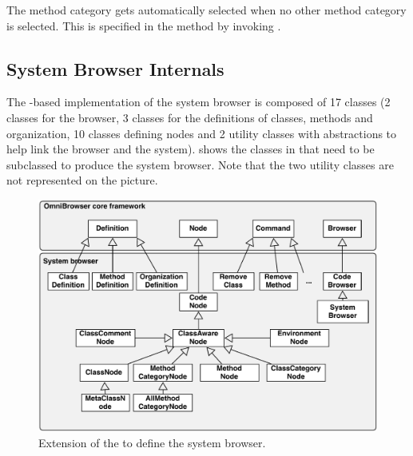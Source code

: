\documentclass[a4paper,10pt,twoside]{book}
\begin{document}
The  method category gets automatically selected when no other method category is selected. This is specified in the  method by invoking .

\subsection{System Browser Internals}
The \ob-based implementation of the \pharo system browser is composed of 17 classes (2 classes for the browser, 3 classes for the definitions of classes, methods and organization, 10 classes defining nodes and 2 utility classes with abstractions to help link the browser and the system).  shows the classes in \obf that need to be subclassed to produce the system browser. Note that the two utility classes are not represented on the picture.





\begin{figure}[!ht]
\begin{center}
\includegraphics[scale=0.55]{obInternal}
\caption{Extension of the \obf to define the system browser.} 
\end{center}
\end{figure}
\end{document}
